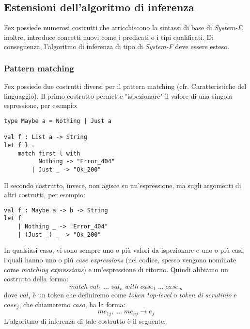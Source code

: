 \documentclass[10pt,a4paper]{article}
\begin{document}
\subsection{Estensioni dell'algoritmo di inferenza}
Fex possiede numerosi costrutti che arricchiscono la sintassi di base di \textit{System-F}, inoltre, introduce
concetti nuovi come i predicati o i tipi qualificati. Di conseguenza, l'algoritmo di inferenza di tipo di \textit{System-F}
deve essere esteso.

\subsubsection{Pattern matching}
Fex possiede due costrutti diversi per il pattern matching (cfr. Caratteristiche del linguaggio). Il primo costrutto
permette "ispezionare" il valore di una singola espressione, per esempio:
\begin{lstlisting}
type Maybe a = Nothing | Just a

val f : List a -> String
let f l =
    match first l with
          Nothing -> "Error_404"
        | Just _ -> "Ok_200"
\end{lstlisting}
Il secondo costrutto, invece, non agisce su un'espressione, ma sugli argomenti di altri costrutti, per esempio:
\begin{lstlisting}
val f : Maybe a -> b -> String
let f
    | Nothing _ -> "Error_404"
    | (Just _) _ -> "Ok_200"
\end{lstlisting}
In qualsiasi caso, vi sono sempre uno o più valori da ispezionare e uno o più casi, i quali hanno uno o più \textit{case
expressions} (nel codice, spesso vengono nominate come \textit{matching expressions}) e un'espressione di ritorno.
Quindi abbiamo un costrutto della forma:
\[ match \; val_1 \; ... \; val_n \; with \; case_1 \; ... \; case_m \]
dove $ val_i $ è un token che definiremo come \textit{token top-level} o \textit{token di scrutinio} e
$ case_j $, che chiameremo \textit{caso}, ha la forma:
\[ me_{1j}, \; ... \; me_{nj} \rightarrow e_j \]
L'algoritmo di inferenza di tale costrutto è il seguente:
\end{document}
